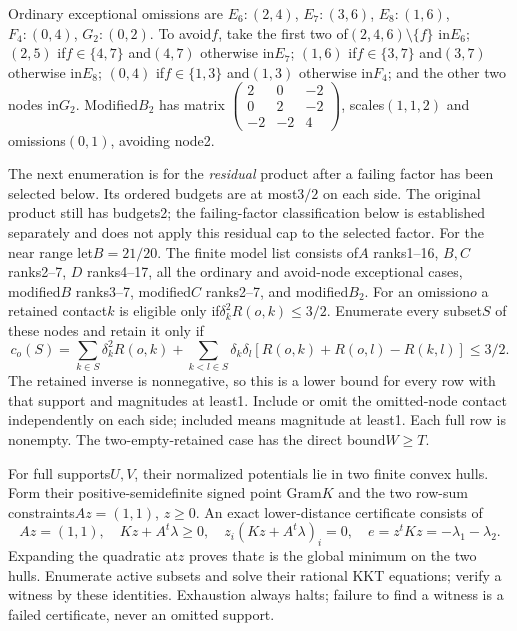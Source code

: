 \documentclass[11pt]{article}
\theoremstyle{remark}\newtheorem{remark}[theorem]{Remark}
\begin{document}
Ordinary exceptional omissions are
$E_6:(2,4)$, $E_7:(3,6)$, $E_8:(1,6)$,
$F_4:(0,4)$, $G_2:(0,2)$. To avoid$f$, take the first two
of$(2,4,6)\setminus\{f\}$ in$E_6$;
$(2,5)$ if$f\in\{4,7\}$ and$(4,7)$ otherwise in$E_7$;
$(1,6)$ if$f\in\{3,7\}$ and$(3,7)$ otherwise in$E_8$;
$(0,4)$ if$f\in\{1,3\}$ and$(1,3)$ otherwise in$F_4$;
and the other two nodes in$G_2$.
Modified$B_2$ has matrix
$\left(\begin{smallmatrix}2&0&-2\\0&2&-2\\-2&-2&4\end{smallmatrix}\right)$,
scales$(1,1,2)$ and omissions$(0,1)$, avoiding node2.

The next enumeration is for the \emph{residual} product after a
failing factor has been selected below. Its ordered
budgets are at most$3/2$ on each side. The original product still
has budgets2; the failing-factor classification below is established
separately and does not apply this residual cap to the selected factor.
For the near range let$B=21/20$. The finite model list consists
of$A$ ranks1--16, $B,C$ ranks2--7, $D$ ranks4--17, all the
ordinary and avoid-node exceptional cases, modified$B$ ranks3--7,
modified$C$ ranks2--7, and modified$B_2$. For an omission$o$ a
retained contact$k$ is eligible only if$\delta_k^2R(o,k)\le3/2$.
Enumerate every subset$S$ of these nodes and retain it only if
\begin{equation}\label{eq:tail-support-cost}
 c_o(S)=\sum_{k\in S}\delta_k^2R(o,k)
 +\sum_{k<l\in S}\delta_k\delta_l
       [R(o,k)+R(o,l)-R(k,l)]\le3/2 .
\end{equation}
The retained inverse is nonnegative, so this is a lower bound for
every row with that support and magnitudes at least1.
Include or omit the omitted-node contact independently on each
side; included means magnitude at least1. Each full row is nonempty.
The two-empty-retained case has the direct bound$W\ge T$.

For full supports$U,V$, their normalized potentials lie in two
finite convex hulls. Form their positive-semidefinite signed
point Gram$K$ and the two row-sum constraints$Az=(1,1)$, $z\ge0$.
An exact lower-distance certificate consists of
\[
 Az=(1,1),\quad Kz+A^t\lambda\ge0,\quad
 z_i(Kz+A^t\lambda)_i=0,\quad
 e=z^tKz=-\lambda_1-\lambda_2.
\]
Expanding the quadratic at$z$ proves that$e$ is the global minimum
on the two hulls. Enumerate active subsets and solve their rational
KKT equations; verify a witness by these identities. Exhaustion
always halts; failure to find a witness is a failed certificate,
never an omitted support.
\end{document}
